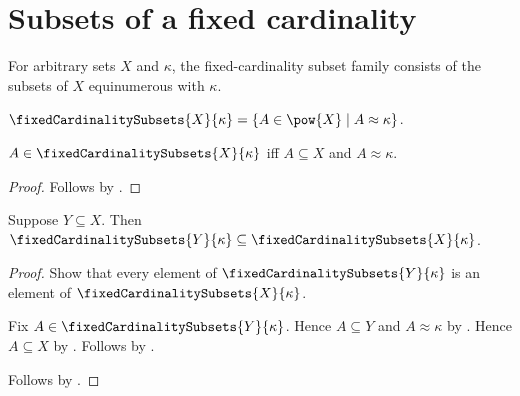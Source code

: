 \section{Subsets of a fixed cardinality}







For arbitrary sets $X$ and $\kappa$, the fixed-cardinality subset family
consists of the subsets of $X$ equinumerous with $\kappa$.

\begin{definition}\label{fixed_cardinality_subsets}
    $\fixedCardinalitySubsets{X}{\kappa}
        =\{A\in\pow{X}\mid A\approx\kappa\}$.
\end{definition}

\begin{proposition}\label{fixed_cardinality_subsets_iff}
    $A\in\fixedCardinalitySubsets{X}{\kappa}$ iff
        $A\subseteq X$ and $A\approx\kappa$.
\end{proposition}
\begin{proof}
    Follows by
        .
\end{proof}

\begin{proposition}\label{fixed_cardinality_subsets_monotone}
    Suppose $Y\subseteq X$.
    Then $\fixedCardinalitySubsets{Y}{\kappa}
        \subseteq\fixedCardinalitySubsets{X}{\kappa}$.
\end{proposition}
\begin{proof}
    Show that every element of $\fixedCardinalitySubsets{Y}{\kappa}$ is an
        element of $\fixedCardinalitySubsets{X}{\kappa}$.
    \begin{subproof}
        Fix $A\in\fixedCardinalitySubsets{Y}{\kappa}$.
        Hence $A\subseteq Y$ and $A\approx\kappa$ by
            .
        Hence $A\subseteq X$ by .
        Follows by .
    \end{subproof}
    Follows by .
\end{proof}

